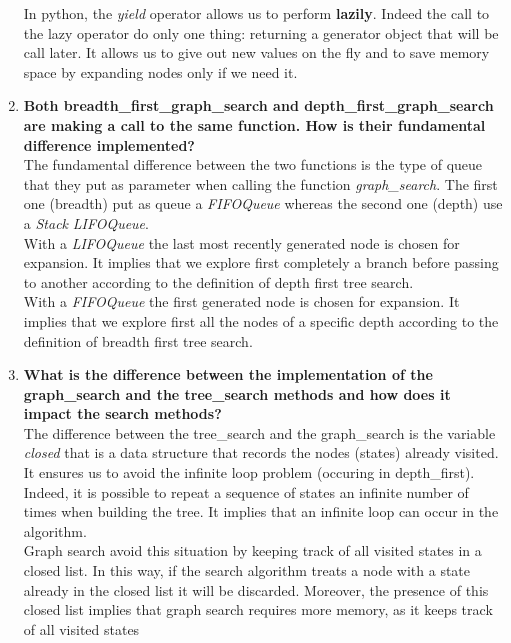 \documentclass[10pt,a4paper]{article}
\begin{document}
\begin{enumerate}
	In python, the \textit{yield} operator allows us to perform \textbf{lazily}. Indeed the call to the lazy operator do only one thing: returning a generator object that will be call later. It allows us to give out new values on the fly and to save memory space by expanding nodes only if we need it.\\ 
	
	\item \textbf{Both breadth\_first\_graph\_search and depth\_first\_graph\_search are making a call to the same function. How is their fundamental difference implemented?} \\
	
	The fundamental difference between the two functions is the type of queue that they put as parameter when calling the function \textit{graph\_search}. The first one (breadth) put as queue a \textit{FIFOQueue} whereas the second one (depth) use a \textit{Stack} \textit{LIFOQueue}.\\
	
	With a \textit{LIFOQueue} the last most recently generated node is chosen for expansion. It implies that we explore first completely a branch before passing to another according to the definition of depth first tree search. \\
	
	With a \textit {FIFOQueue} the first generated node is chosen for expansion. It implies that  we explore first all the nodes of a specific depth according to the definition of breadth first tree search.\\
	
	\item \textbf{What is the difference between the implementation of the graph\_search and the tree\_search methods and how does it impact the search methods?}\\
	
	The difference between the tree\_search and the graph\_search is the variable \textit{closed} that is a data structure that records the nodes (states) already visited. It ensures us to avoid the infinite loop problem (occuring in depth\_first). \\
	
	Indeed, it is possible to repeat a sequence of states an infinite number of times when building the tree. It implies that an infinite loop can occur in the algorithm. \\
	
	Graph search avoid this situation by keeping track of all visited states in a closed list. In this way, if the search algorithm treats a node with a state already in the closed list it will be discarded.
	Moreover, the presence of this closed list implies that graph search requires more memory, as it keeps track of all visited states \\
	

\end{enumerate}
\end{document}
